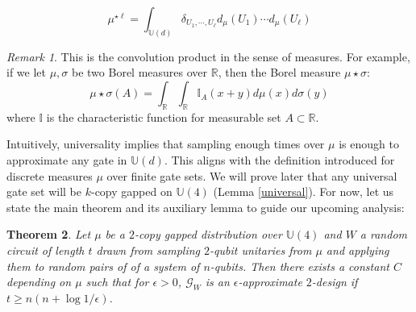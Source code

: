 \documentclass[12pt]{amsart}
\newtheorem{theorem}{Theorem}[section]
\theoremstyle{definition}
\theoremstyle{remark}
\newtheorem{remark}[theorem]{Remark}
\numberwithin{equation}{section}
\theoremstyle{remark}
\begin{document}
%
\begin{equation}
\mu^{\star \ell} = \int_{\mathbb{U}(d)} \delta_{U_1,\cdots, U_\ell} d_\mu(U_1)\cdots d_\mu(U_\ell)
\end{equation}
%
\begin{remark}
  This is the convolution product in the sense of measures. For example, if we let $\mu,\sigma$ be two Borel measures over $\mathbb{R}$, then the Borel measure $\mu \star \sigma$:
  $$ \mu \star \sigma(A) = \int_{\mathbb{R}}\int_{\mathbb{R}} \mathbb{I}_A(x+y) d\mu(x)d\sigma(y)$$
  where $\mathbb{I}$ is the characteristic function for measurable set $A \subset \mathbb{R}$.
\end{remark}
\noindent Intuitively, universality implies that sampling enough times over $\mu$ is enough to approximate any gate in $\mathbb{U}(d)$. This aligns with the definition introduced for discrete measures $\mu$ over finite gate sets. We will prove later that any universal gate set will be $k$-copy gapped on $\mathbb{U}(4)$ (Lemma \ref{universal}). For now, let us state the main theorem and its auxiliary lemma to guide our upcoming analysis:
%
\begin{theorem} \label{maintheorem}
  Let $\mu$ be a $2$-copy gapped distribution over $\mathbb{U}(4)$ and $W$ a random circuit of length $t$ drawn from sampling $2$-qubit unitaries from $\mu$ and applying them to random pairs of of a system of $n$-qubits. Then there exists a constant $C$ depending on $\mu$ such that for $\epsilon > 0$, $\mathcal{G}_W$ is an $\epsilon$-approximate $2$-design if $t \geq n(n + \log 1/\epsilon)$.
\end{theorem}
\end{document}
